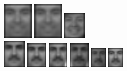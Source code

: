\begin{figure}[hbt]
  \includegraphics[width=42pt]{../results/L_rez/correct90/2/8.jpg}
  \includegraphics[width=42pt]{../results/L_rez/correct90/2/8.jpg}
  \includegraphics[width=31pt]{../results/L_rez/correct90/2/10.jpg} \\
  \vspace{4pt}
  \includegraphics[width=0.1\textwidth]{../results/L_rez/correct90/3/testImg.jpg} \vline
  \hspace{2pt}
  \includegraphics[width=0.09\textwidth]{../results/L_rez/correct90/3/1.jpg}
  \includegraphics[width=0.09\textwidth]{../results/L_rez/correct90/3/2.jpg}
  \includegraphics[width=0.09\textwidth]{../results/L_rez/correct90/3/3.jpg}
  \includegraphics[width=0.07\textwidth]{../results/L_rez/correct90/3/4.jpg}
  \includegraphics[width=0.07\textwidth]{../results/L_rez/correct90/3/5.jpg}

\end{figure}

